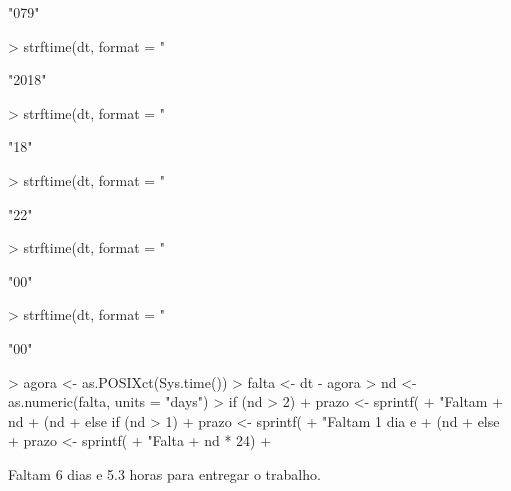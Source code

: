 \documentclass[a4paper]{article}
\newcommand{\tc}[1]{\textcolor{utahcrimson}{#1}}
\begin{document}
\begin{Schunk}
\begin{Soutput}
[1] "079"
\end{Soutput}
\begin{Sinput}
> strftime(dt, format = "%Y") # Ano.
\end{Sinput}
\begin{Soutput}
[1] "2018"
\end{Soutput}
\begin{Sinput}
> strftime(dt, format = "%y") # Ano só a dezena.
\end{Sinput}
\begin{Soutput}
[1] "18"
\end{Soutput}
\begin{Sinput}
> strftime(dt, format = "%H") # Hora.
\end{Sinput}
\begin{Soutput}
[1] "22"
\end{Soutput}
\begin{Sinput}
> strftime(dt, format = "%M") # Minuto.
\end{Sinput}
\begin{Soutput}
[1] "00"
\end{Soutput}
\begin{Sinput}
> strftime(dt, format = "%S") # Segundo.
\end{Sinput}
\begin{Soutput}
[1] "00"
\end{Soutput}
\begin{Sinput}
> agora <- as.POSIXct(Sys.time())
> falta <- dt - agora
> nd <- as.numeric(falta, units = "days")
> if (nd > 2) {
+     prazo <- sprintf(
+         "Faltam %d dias e %0.1f horas para entregar o trabalho",
+         nd %/% 1,
+         (nd %% 1) * 24)
+ } else if (nd > 1) {
+     prazo <- sprintf(
+         "Faltam 1 dia e %0.1f horas para entregar o trabalho",
+         (nd %% 1) * 24)
+ } else {
+     prazo <- sprintf(
+         "Falta %0.1f horas para entregar o trabalho",
+         nd * 24)
+ }
\end{Sinput}
\end{Schunk}

\tc{Faltam 6 dias e 5.3 horas para entregar o trabalho}.
\end{document}
